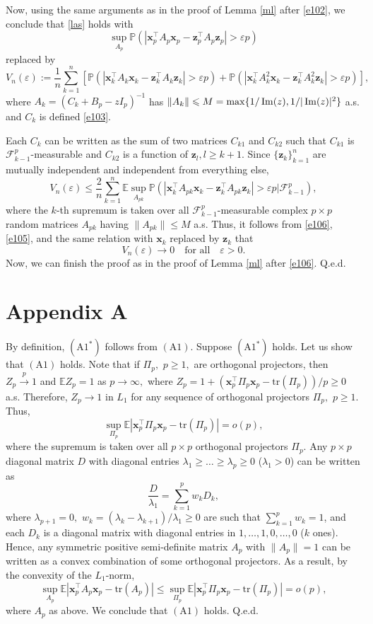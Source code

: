 \documentclass[12pt, a4paper]{article}
\newcommand\x{\mathbf x}
\renewcommand\Im{{\rm\,Im} }
\newcommand\z{{\mathbf z}}
\newcommand\pto{\stackrel p\rightarrow}
\newcommand\e{{\mathbb E}}
\newcommand\p{{\mathbb P}}
\newcommand\tr{{\mathrm{tr}}}
\newcommand\cF{{\mathcal F}}
\begin{document}
Now, using the same arguments as in the proof of Lemma \ref{ml} after \eqref{e102}, we conclude that \eqref{las} holds with  
\[\sup_{ A_p}\p(|\x_p^\top  A_p \x_p-\z_p^\top  A_p \z_p|>\varepsilon  p)\] replaced by 
\[V_n(\varepsilon):=\frac{1}{n}\sum_{k=1}^n[\p(|\x_k^\top  A_k \x_k-\z_k^\top  A_k \z_k|>\varepsilon  p)+\p(|\x_k^\top  A_k^2 \x_k-\z_k^\top  A_k^2 \z_k|>\varepsilon  p)],\]
where  $A_k=(C_k+B_p-zI_p)^{-1}$ has $\|A_k\|\leqslant M=\max\{1/\Im(z),1/|\Im(z)|^2\}$ a.s.  and  $C_k$ is defined \eqref{e103}.

Each $C_k$ can be written as the sum of two matrices $C_{k1} $ and $C_{k2}$ such that $C_{k1}$ is $\cF_{k-1}^p$-measurable   and $C_{k2}$ 
is a function of $\z_l, l\geqslant k+1$. Since  $\{\z_k\}_{k=1}^n$ are mutually independent and independent from everything else, 
\begin{equation}
\label{e104}
V_n(\varepsilon)\leqslant \frac{2}{n}\sum_{k=1}^n\e\sup_{A_{pk}}\p(|\x_k^\top  A_{pk} \x_k-\z_k^\top  A_{pk} \z_k|>\varepsilon  p|\cF_{k-1}^p),\end{equation}
where the $k$-th supremum is taken over all $\cF_{k-1}^p$-measurable complex $p\times p$ random  matrices $A_{pk}$ having $\|A_{pk}\|\leqslant M $ a.s.  Thus, it follows from \eqref{e106}, \eqref{e105}, and the same relation with $\x_k$ replaced by $\z_k$ that 
\[V_n(\varepsilon)\to0\quad \text{for all}\quad\varepsilon>0.\]
Now, we can finish the proof  as in the proof of Lemma \ref{ml} after \eqref{e106}. Q.e.d. 


 
 
\section*{Appendix A}
 By definition, $(\mathrm A1^*)$ follows from $(\mathrm A1)$. Suppose $(\mathrm A1^*)$ holds. Let us show that $(\mathrm A1)$ holds. Note that  if  $\Pi_p,$ $p\geqslant1,$ are orthogonal projectors, then  
  $Z_p\pto 1$  and $\e Z_p=1$ as $p\to\infty,$ where 
$Z_p=1+(\x_p^\top \Pi_p\x_p-\tr(\Pi_p))/p\geqslant 0$ a.s. Therefore, $Z_p\to 1$ in $L_1$ for any sequence of orthogonal projectors $\Pi_p,$ $p\geqslant 1$. Thus, 
\[\sup_{\Pi_p}\e|\x_p^\top \Pi_p\x_p-\tr(\Pi_p)|=o(p),\]
where the supremum is taken over all $p\times 
p $ orthogonal projectors $\Pi_p.$ Any $p\times p$ diagonal matrix $D $ with diagonal entries $\lambda_1\geqslant \ldots\geqslant \lambda_p\geqslant 0$ ($\lambda_1>0$) can be written as  \[\frac{D}{\lambda_1}=\sum_{k=1}^pw_k D_k,\]
where $\lambda_{p+1}=0,$  $w_k=(\lambda_k-\lambda_{k+1})/\lambda_1\geqslant 0$ are such that $\sum_{k=1}^pw_k=1$, and each $D_k$ is a diagonal matrix with diagonal entries in $1,\ldots,1,0,\ldots,0$ ($k$ ones). Hence, any  symmetric positive semi-definite matrix $A_p$ with $\|A_p\|=1$  can be written as a convex combination of some orthogonal projectors. As a result, by the convexity of the $L_1$-norm,
\[\sup_{ A_p}\e|\x_p^\top A_p\x_p-\tr( A_p)|\leqslant \sup_{ \Pi_p}\e|\x_p^\top \Pi_p\x_p-\tr(\Pi_p)| =o(p),\]
where $A_p$ as above. We conclude that $(\mathrm A1)$ holds. Q.e.d.
\end{document}
